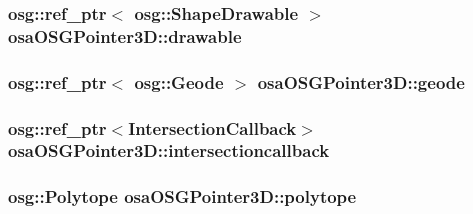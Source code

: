 \subsubsection[{drawable}]{\setlength{\rightskip}{0pt plus 5cm}osg\+::ref\+\_\+ptr$<$ osg\+::\+Shape\+Drawable $>$ osa\+O\+S\+G\+Pointer3\+D\+::drawable\hspace{0.3cm}{\ttfamily [protected]}}\label{classosa_o_s_g_pointer3_d_ab6c2c828a3e43d02bb12dac34b12cbbc}
\hypertarget{classosa_o_s_g_pointer3_d_af706c282ea0f7b14ae0b430a3b769510}{}
\subsubsection[{geode}]{\setlength{\rightskip}{0pt plus 5cm}osg\+::ref\+\_\+ptr$<$ osg\+::\+Geode $>$ osa\+O\+S\+G\+Pointer3\+D\+::geode\hspace{0.3cm}{\ttfamily [protected]}}\label{classosa_o_s_g_pointer3_d_af706c282ea0f7b14ae0b430a3b769510}
\hypertarget{classosa_o_s_g_pointer3_d_add1c2a935b2af684bf2cc3c180410a1c}{}
\subsubsection[{intersectioncallback}]{\setlength{\rightskip}{0pt plus 5cm}osg\+::ref\+\_\+ptr$<${\bf Intersection\+Callback}$>$ osa\+O\+S\+G\+Pointer3\+D\+::intersectioncallback\hspace{0.3cm}{\ttfamily [protected]}}\label{classosa_o_s_g_pointer3_d_add1c2a935b2af684bf2cc3c180410a1c}
\hypertarget{classosa_o_s_g_pointer3_d_a99d8f639a80c650298763ab6f28c711a}{}
\subsubsection[{polytope}]{\setlength{\rightskip}{0pt plus 5cm}osg\+::\+Polytope osa\+O\+S\+G\+Pointer3\+D\+::polytope\hspace{0.3cm}{\ttfamily [protected]}}\label{classosa_o_s_g_pointer3_d_a99d8f639a80c650298763ab6f28c711a}
\hypertarget{classosa_o_s_g_pointer3_d_acd02af84dcccbf5bb89fda754600414d}{}

